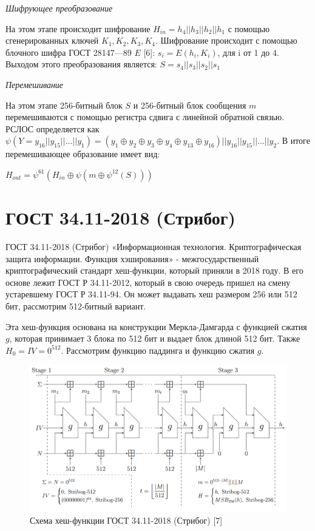 \documentclass[colorthm]{./civarticle}
\begin{document}
\textit{Шифрующее преобразование}

На этом этапе происходит шифрование $H_{in}=h_4||h_3||h_2||h_1$ с помощью сгенерированных ключей $K_1, K_2, K_3, K_4$. Шифрование происходит с помощью блочного шифра ГОСТ 28147—89 $E$ [6]: $s_i = E(h_i, K_i)$, для i от 1 до 4. Выходом этого преобразования является: $S=s_4||s_3||s_2||s_1$

\textit{Перемешивание}

На этом этапе 256-битный блок $S$ и 256-битный блок сообщения $m$ перемешиваются с помощью регистра сдвига с линейной обратной связью. РСЛОС определяется как $\psi(Y=y_{16}||y_{15}||...||y_1)=(y_1 \oplus y_2 \oplus y_3 \oplus y_4 \oplus y_{13} \oplus y_{16})||y_{16}||y_{15}||...||y_{2}$. В итоге перемешивающее образование имеет вид:

$H_{out} = \psi^{61}(H_{in} \oplus \psi(m \oplus \psi^{12}(S)))$


\section{ГОСТ 34.11-2018 (Стрибог)}
ГОСТ 34.11-2018 (Стрибог) «Информационная технология. Криптографическая защита информации. Функция хэширования» - межгосударственный криптографический стандарт хеш-функции, который приняли в 2018 году. В его основе лежит ГОСТ Р 34.11-2012, который в свою очередь пришел на смену устаревшему ГОСТ Р 34.11-94. Он может выдавать хеш размером 256 или 512 бит, рассмотрим 512-битный вариант.

Эта хеш-функция основана на конструкции Меркла-Дамгарда с функцией сжатия $g$, которая принимает 3 блока по 512 бит и выдает блок длиной 512 бит. Также $H_0 = IV = 0^{512}$. Рассмотрим функцию паддинга и функцию сжатия $g$.

\begin{figure}[H]
    \centering
    \includegraphics[width=0.75\linewidth]{gost_34_11_2018.png}
    \caption{Схема хеш-функции ГОСТ 34.11-2018 (Стрибог) [7]}
    \label{fig:enter-label}
\end{figure}
\end{document}

